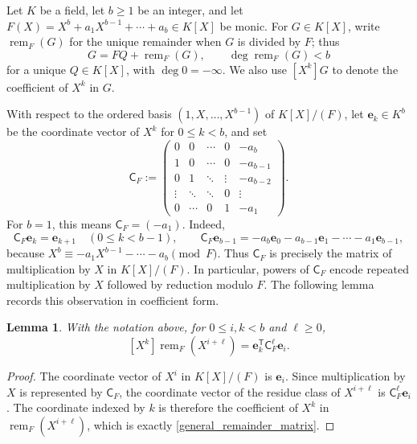 \documentclass[12pt]{article}
\newtheorem{lemma}{Lemma}[section]
\theoremstyle{remark}
\begin{document}
\smallskip
Let $K$ be a field, let $b\ge1$ be an integer, and let
$F(X)=X^b+a_1X^{b-1}+\cdots+a_b\in K[X]$ be monic.  For $G\in K[X]$, write $\operatorname{rem}_{F}(G)$ for the
unique remainder when $G$ is divided by $F$; thus
\[
 G=FQ+\operatorname{rem}_{F}(G),\qquad
 \deg \operatorname{rem}_{F}(G)<b
\]
for a unique $Q\in K[X]$, with $\deg 0=-\infty$.  We also use
$[X^k]G$ to denote the
coefficient of $X^k$ in $G$.

With respect to the ordered basis $(1,X,\ldots,X^{b-1})$ of
$K[X]/(F)$, let $\mathbf e_k\in K^b$ be the coordinate vector of $X^k$
for $0\le k<b$, and set
\begin{equation*}
 \mathsf C_F:=
 \begin{pmatrix}
  0&0&\cdots&0&-a_b\\
  1&0&\cdots&0&-a_{b-1}\\
  0&1&\ddots&\vdots&-a_{b-2}\\
  \vdots&\ddots&\ddots&0&\vdots\\
  0&\cdots&0&1&-a_1
 \end{pmatrix}.
\end{equation*}
For $b=1$, this means $\mathsf C_F=(-a_1)$.  Indeed,
\[
 \mathsf C_F\mathbf e_k=\mathbf e_{k+1}\quad(0\le k<b-1),
 \qquad
 \mathsf C_F\mathbf e_{b-1}
 =-a_b\mathbf e_0-a_{b-1}\mathbf e_1-\cdots-a_1\mathbf e_{b-1},
\]
because $X^b\equiv-a_1X^{b-1}-\cdots-a_b\pmod F$.
Thus $\mathsf C_F$ is precisely the matrix of multiplication by $X$
in $K[X]/(F)$.  In particular, powers of $\mathsf C_F$ encode repeated
multiplication by $X$ followed by reduction modulo $F$.  The following
lemma records this observation in coefficient form.

\begin{lemma}\label{companionremainder}
With the notation above, for $0\le i,k<b$ and $\ell\ge0$,
\begin{equation}\label{general_remainder_matrix}
 [X^k]\operatorname{rem}_{F}(X^{i+\ell})
 =\mathbf e_k^{\mathsf T}\mathsf C_F^\ell \mathbf e_i.
\end{equation}
\end{lemma}
\begin{proof}
The coordinate vector of $X^i$ in $K[X]/(F)$ is $\mathbf e_i$.  Since
multiplication by $X$ is represented by $\mathsf C_F$, the coordinate
vector of the residue class of $X^{i+\ell}$ is
$\mathsf C_F^\ell \mathbf e_i$.  The coordinate indexed by $k$ is therefore the coefficient of $X^k$ in $\operatorname{rem}_{F}(X^{i+\ell})$, which is
exactly \eqref{general_remainder_matrix}.
\end{proof}
\end{document}
